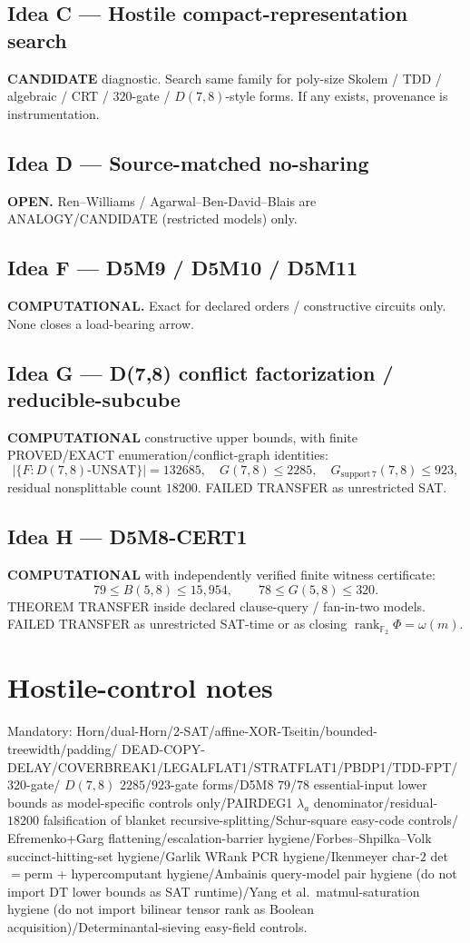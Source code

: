 \documentclass[11pt]{article}
\begin{document}
\subsection*{Idea C --- Hostile compact-representation search}
\textbf{CANDIDATE} diagnostic. Search same family for poly-size Skolem / TDD /
algebraic / CRT / $320$-gate / $D(7,8)$-style forms. If any exists, provenance is
instrumentation.

\subsection*{Idea D --- Source-matched no-sharing}
\textbf{OPEN.} Ren--Williams / Agarwal--Ben-David--Blais are ANALOGY/CANDIDATE
(restricted models) only.

\subsection*{Idea F --- D5M9 / D5M10 / D5M11}
\textbf{COMPUTATIONAL.} Exact for declared orders / constructive circuits only.
None closes a load-bearing arrow.

\subsection*{Idea G --- D(7,8) conflict factorization / reducible-subcube}
\textbf{COMPUTATIONAL} constructive upper bounds, with finite PROVED/EXACT
enumeration/conflict-graph identities:
\[
|\{F:D(7,8)\text{-UNSAT}\}|=132685,\quad
G(7,8)\le 2285,\quad
G_{\mathrm{support}\,7}(7,8)\le 923,
\]
residual nonsplittable count $18200$. FAILED TRANSFER as unrestricted SAT.

\subsection*{Idea H --- D5M8-CERT1}
\textbf{COMPUTATIONAL} with independently verified finite witness certificate:
\[
79\le B(5,8)\le 15{,}954,\qquad 78\le G(5,8)\le 320.
\]
THEOREM TRANSFER inside declared clause-query / fan-in-two models.
FAILED TRANSFER as unrestricted SAT-time or as closing
$\operatorname{rank}_{\mathbb F_2}\Phi=\omega(m)$.

\section*{Hostile-control notes}
Mandatory: Horn/dual-Horn/2-SAT/affine-XOR-Tseitin/bounded-treewidth/padding/
DEAD-COPY-DELAY/COVERBREAK1/LEGALFLAT1/STRATFLAT1/PBDP1/TDD-FPT/$320$-gate/
$D(7,8)$ $2285$/$923$-gate forms/D5M8 $79$/$78$ essential-input lower bounds as
model-specific controls only/PAIRDEG1 $\lambda_a$ denominator/residual-$18200$
falsification of blanket recursive-splitting/Schur-square easy-code controls/
Efremenko+Garg flattening/escalation-barrier hygiene/Forbes--Shpilka--Volk
succinct-hitting-set hygiene/Garlik WRank PCR hygiene/Ikenmeyer char-$2$
det$=$perm + hypercomputant hygiene/Ambainis query-model pair hygiene (do not
import DT lower bounds as SAT runtime)/Yang et al.\ matmul-saturation hygiene
(do not import bilinear tensor rank as Boolean acquisition)/Determinantal-sieving
easy-field controls.
\end{document}
